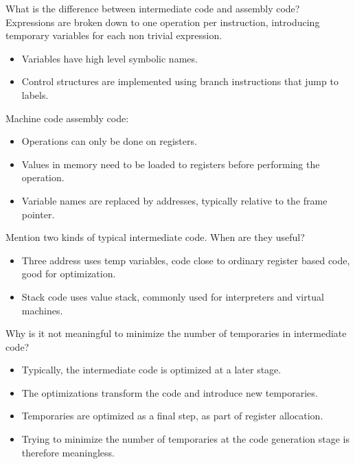 \documentclass[11pt]{beamer}
\begin{document}
\begin{frame}
\begin{block}{What is the difference between intermediate code and assembly code? }
Expressions are broken down to one operation per instruction, introducing temporary variables for each non trivial expression.
\begin{itemize}
\item Variables have high level symbolic names.
\item Control structures are implemented using branch instructions that  jump to labels.
\end{itemize}
Machine code assembly code: 
\begin{itemize}
\item Operations can only be done on registers.
\item Values in memory need to be loaded to registers before performing the operation.
\item Variable names are replaced by addresses, typically relative to the frame pointer.
\end{itemize}
\end{block}
\end{frame}

\begin{frame}
\begin{block}{Mention two kinds of typical intermediate code. When are they useful?}
\begin{itemize}
\item Three address uses temp variables, code close to ordinary register based code, good for optimization.
\item Stack code uses value stack, commonly used for interpreters and virtual machines.
\end{itemize}
\end{block}

\begin{block}{Why is it not meaningful to minimize the number of temporaries in intermediate code? }
\begin{itemize}
\item Typically, the intermediate code is optimized at a later stage.
\item The optimizations transform  the code and introduce new temporaries. 
\item Temporaries are optimized as a final step, as part of register allocation.
\item Trying to minimize the number of temporaries at the code generation stage is therefore meaningless.
\end{itemize}
\end{block}
\end{frame}
\end{document}
